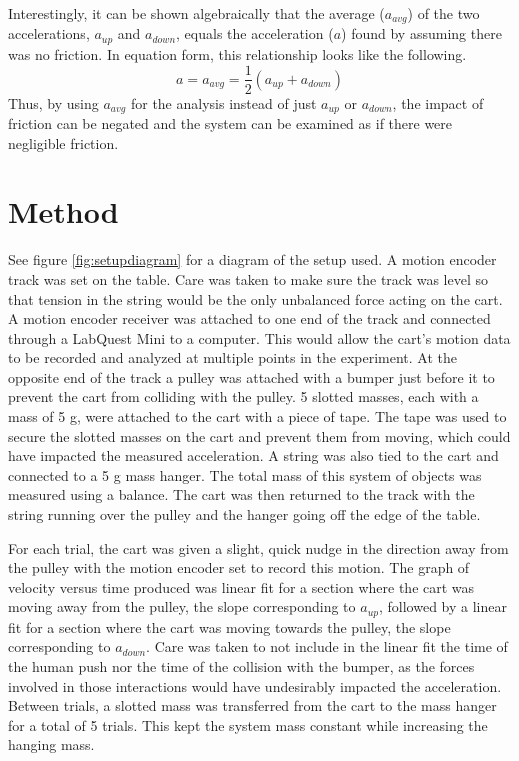 \documentclass[12pt]{iopart}
\begin{document}
Interestingly, it can be shown algebraically that the average ($a_{avg}$) of the two accelerations, $a_{up}$ and $a_{down}$, equals the acceleration ($a$) found by assuming there was no friction.
In equation form, this relationship looks like the following.
\begin{equation}
a = a_{avg} = \frac{1}{2} (a_{up} + a_{down})
\end{equation}
Thus, by using $a_{avg}$ for the analysis instead of just $a_{up}$ or $a_{down}$, the impact of friction can be negated and the system can be examined as if there were negligible friction.

\section{Method}

See figure \ref{fig:setupdiagram} for a diagram of the setup used.
A motion encoder track was set on the table.
Care was taken to make sure the track was level so that tension in the string would be the only unbalanced force acting on the cart.
A motion encoder receiver was attached to one end of the track and connected through a LabQuest Mini to a computer.
This would allow the cart's motion data to be recorded and analyzed at multiple points in the experiment.
At the opposite end of the track a pulley was attached with a bumper just before it to prevent the cart from colliding with the pulley.
5 slotted masses, each with a mass of 5 g, were attached to the cart with a piece of tape.
The tape was used to secure the slotted masses on the cart and prevent them from moving, which could have impacted the measured acceleration.
A string was also tied to the cart and connected to a 5 g mass hanger.
The total mass of this system of objects was measured using a balance.
The cart was then returned to the track with the string running over the pulley and the hanger going off the edge of the table.

For each trial, the cart was given a slight, quick nudge in the direction away from the pulley with the motion encoder set to record this motion.
The graph of velocity versus time produced was linear fit for a section where the cart was moving away from the pulley, the slope corresponding to $a_{up}$, followed by a linear fit for a section where the cart was moving towards the pulley, the slope corresponding to $a_{down}$.
Care was taken to not include in the linear fit the time of the human push nor the time of the collision with the bumper, as the forces involved in those interactions would have undesirably impacted the acceleration.
Between trials, a slotted mass was transferred from the cart to the mass hanger for a total of 5 trials.
This kept the system mass constant while increasing the hanging mass.
\end{document}
